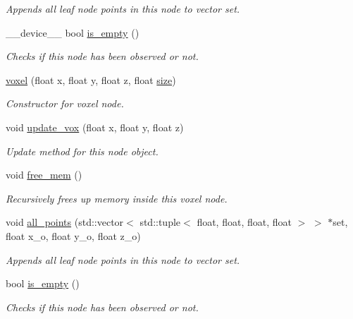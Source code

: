\begin{DoxyCompactItemize}
\begin{DoxyCompactList}\small\item\em Appends all leaf node points in this node to vector set. \end{DoxyCompactList}\item 
\+\_\+\+\_\+device\+\_\+\+\_\+ bool \hyperlink{classvoxel_ae8d08bec6f007a905812764672327522}{is\+\_\+empty} ()
\begin{DoxyCompactList}\small\item\em Checks if this node has been observed or not. \end{DoxyCompactList}\item 
\hyperlink{classvoxel_a77f20a6fddec8f3aa3c719c3dc609948}{voxel} (float x, float y, float z, float \hyperlink{classvoxel_a573bae3d6e8383a4b2235d3cd33e7ab6}{size})
\begin{DoxyCompactList}\small\item\em Constructor for voxel node. \end{DoxyCompactList}\item 
void \hyperlink{classvoxel_ae550590cfe0d4c3d0e78cbf0cfa3390f}{update\+\_\+vox} (float x, float y, float z)
\begin{DoxyCompactList}\small\item\em Update method for this node object. \end{DoxyCompactList}\item 
void \hyperlink{classvoxel_ac766278266424ede18f1fae9ccfd88be}{free\+\_\+mem} ()
\begin{DoxyCompactList}\small\item\em Recursively frees up memory inside this voxel node. \end{DoxyCompactList}\item 
void \hyperlink{classvoxel_aaea83372a2e28b25ae65dcc635ebe635}{all\+\_\+points} (std\+::vector$<$ std\+::tuple$<$ float, float, float, float $>$ $>$ $\ast$set, float x\+\_\+o, float y\+\_\+o, float z\+\_\+o)
\begin{DoxyCompactList}\small\item\em Appends all leaf node points in this node to vector set. \end{DoxyCompactList}\item 
bool \hyperlink{classvoxel_afe0d1d928ee0358b0fc0a67f58793cfd}{is\+\_\+empty} ()
\begin{DoxyCompactList}\small\item\em Checks if this node has been observed or not. \end{DoxyCompactList}\end{DoxyCompactItemize}
